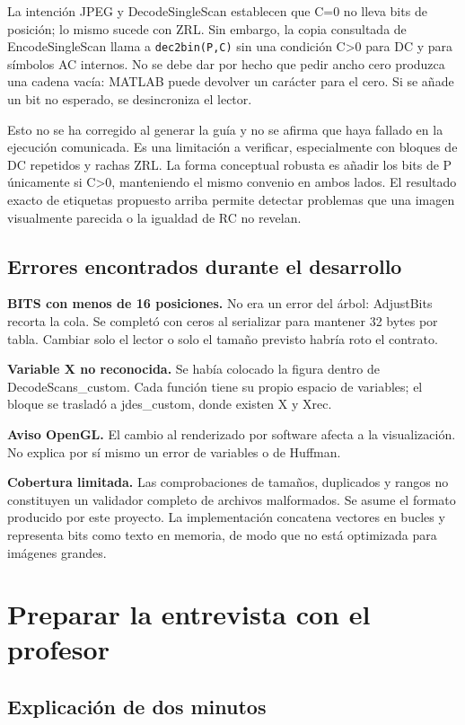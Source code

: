 \documentclass[11pt,a4paper,oneside]{report}
\begin{document}
La intención JPEG y DecodeSingleScan establecen que C=0 no lleva bits de
posición; lo mismo sucede con ZRL. Sin embargo, la copia consultada de
EncodeSingleScan llama a \texttt{dec2bin(P,C)} sin una condición C>0 para
DC y para símbolos AC internos. No se debe dar por hecho que pedir ancho
cero produzca una cadena vacía: MATLAB puede devolver un carácter para el cero.
Si se añade un bit no esperado, se desincroniza el lector.

Esto no se ha corregido al generar la guía y no se afirma que haya fallado
en la ejecución comunicada. Es una limitación a verificar, especialmente con
bloques de DC repetidos y rachas ZRL. La forma conceptual robusta es añadir
los bits de P únicamente si C>0, manteniendo el mismo convenio en ambos lados.
El resultado exacto de etiquetas propuesto arriba permite detectar problemas
que una imagen visualmente parecida o la igualdad de RC no revelan.


\section{Errores encontrados durante el desarrollo}

\textbf{BITS con menos de 16 posiciones.} No era un error del árbol: AdjustBits
recorta la cola. Se completó con ceros al serializar para mantener 32 bytes
por tabla. Cambiar solo el lector o solo el tamaño previsto habría roto el contrato.

\textbf{Variable X no reconocida.} Se había colocado la figura dentro de
DecodeScans\_custom. Cada función tiene su propio espacio de variables;
el bloque se trasladó a jdes\_custom, donde existen X y Xrec.

\textbf{Aviso OpenGL.} El cambio al renderizado por software afecta a la
visualización. No explica por sí mismo un error de variables o de Huffman.

\textbf{Cobertura limitada.} Las comprobaciones de tamaños, duplicados y rangos
no constituyen un validador completo de archivos malformados. Se asume el
formato producido por este proyecto. La implementación concatena vectores
en bucles y representa bits como texto en memoria, de modo que no está
optimizada para imágenes grandes.


\chapter{Preparar la entrevista con el profesor}
\section{Explicación de dos minutos}
\end{document}
